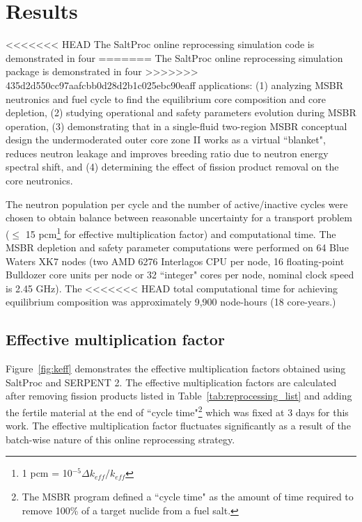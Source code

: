 \section{Results}
<<<<<<< HEAD
The SaltProc online reprocessing simulation code is demonstrated in four 
=======
The SaltProc online reprocessing simulation package is demonstrated in four 
>>>>>>> 435d2d550cc97aafcbb0d28d2b1c025ebc90eaff
applications: (1) analyzing  \gls{MSBR} neutronics and fuel cycle to find the 
equilibrium core composition and core depletion, (2) studying operational and 
safety parameters evolution during \gls{MSBR} operation, (3) demonstrating that 
in a single-fluid two-region \gls{MSBR} conceptual design the undermoderated 
outer core zone II works as a virtual ``blanket", reduces neutron leakage and 
improves breeding ratio due to neutron energy spectral shift, and (4) 
determining the effect of fission product removal on the core neutronics.

The neutron population per cycle and the number of active/inactive cycles were 
chosen to obtain balance between reasonable uncertainty for a transport problem 
($\leq$ 15 pcm\footnote{ 1 pcm = 10$^{-5}\Delta k_{eff}/k_{eff}$} for effective 
multiplication factor) and computational time. The \gls{MSBR} depletion and 
safety parameter computations were performed on 64 Blue Waters XK7 nodes (two 
AMD 6276 Interlagos CPU per node, 16 floating-point Bulldozer core units per 
node or 32 ``integer" cores per node, nominal clock speed is 2.45 GHz). The 
<<<<<<< HEAD
total computational time for achieving equilibrium composition was approximately 
9,900 node-hours (18 core-years.)

\subsection{Effective multiplication factor}
Figure~\ref{fig:keff} demonstrates the effective multiplication factors obtained 
using SaltProc and SERPENT 2. The effective multiplication factors are 
calculated after removing fission products listed in 
Table~\ref{tab:reprocessing_list} and adding the fertile material at the end of 
``cycle time"\footnote{ The \gls{MSBR} program defined a ``cycle time" as the 
amount of time required to remove 100\% of a target nuclide from a fuel salt.} 
which was fixed at 3 days for this work. The effective multiplication factor 
fluctuates significantly as a result of the batch-wise nature of this online 
reprocessing strategy. 

